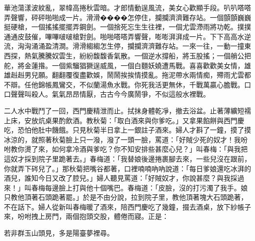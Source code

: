 \begin{showcontents}{}
華池蕩漾波紋亂，翠幃高捲秋雲暗。才郎情動逞風流，美女心歡顯手段。叭叭嗒嗒弄聲響，砰砰啪啪成一片。滑滑����怎停住，攔攔濟濟難存站。一個顫顫巍巍挺硬槍，一個搖搖擺擺弄鋼劍。一個捨死忘生生往裡，一個尤雲滯雨將功乾。撲撲通通皮鼓催，嗶嗶啵啵槍對劍。啪啪嗒嗒弄響聲，嘭嘭湃湃成一片。下下高高水逆流，洶洶涌涌盈清澗。滑滑縐縐怎生停，攔攔濟濟難存站。一來一往，一動一撞東西探，熱氣騰騰奴雲生，紛紛馥馥香氣散。一個逆水撐船，將玉股搖；一個艄公把舵，將金蓮揝。一個紫騮猖獗逞威風，一個白麵妖嬈遭馬戰。喜喜歡歡美女情，雄雄赳赳男兒願。翻翻覆復盡歡娛，鬧鬧挨挨情摸亂。拖泥帶水兩情痴，殢雨尤雲都不辯。任他錦帳鳳鸞交，不似蘭湯魚水戰。你死我活更無休，千戰萬贏心膽戰。口口聲聲叫殺人。氣氣昂昂情厭，古古今今廣鬧爭，不似這般水裡戰。

二人水中戰鬥了一回，西門慶精泄而止。拭抹身體乾凈，撤去浴盆。止著薄纊短襦上床，安放炕桌果酌飲酒。教秋菊：「取白酒來與你爹吃。」又拿果餡餅與西門慶吃，恐怕他肚中饑餓。只見秋菊半日拿上一銀註子酒來。婦人才斟了一鐘，摸了摸冰涼的，就照著秋菊臉上只一潑，潑了一頭一臉，罵道：「好賊少死的奴才！我吩咐教你燙了來，如何拿冷酒與爹吃？你不知安排些甚麼心兒？」叫春梅：「與我把這奴才採到院子里跪著去。」春梅道：「我替娘後邊捲裹腳去來，一些兒沒在跟前，你就弄下硶兒了。」那秋菊把嘴谷都著，口裡喃喃吶吶說道：「每日爹娘還吃冰湃的酒兒，誰知今日又改了腔兒。」婦人聽見罵道：「好賊奴才，你說甚麼？與我採過來！」叫春梅每邊臉上打與他十個嘴巴。春梅道：「皮臉，沒的打污濁了我手。娘只教他頂著石頭跪著罷。」於是不由分說，拉到院子里，教他頂著塊大石頭跪著，不在話下。婦人從新叫春梅暖了酒來，陪西門慶吃了幾鐘，掇去酒桌，放下紗帳子來，吩咐拽上房門，兩個抱頭交股，體倦而寢。正是：

若非群玉山頭見，多是陽臺夢裡尋。




\end{showcontents}


